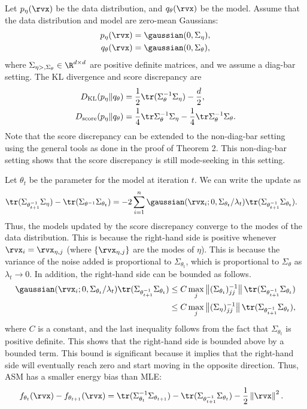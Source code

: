 \documentclass{article} %
\begin{document}
Let $p_{\eta}(\rvx)$ be the data distribution, and $q_{\theta}(\rvx)$ be the model. Assume that the data distribution and model are zero-mean Gaussians:
\begin{align*}
	p_{\eta}(\rvx) &= \gaussian(0, \Sigma_{\eta}), \\
    q_{\theta}(\rvx) &= \gaussian(0, \Sigma_{\theta}),
\end{align*}
where $\Sigma_{\eta>, \Sigma_{\theta}} \in \R^{d \times d}$ are positive definite matrices, and we assume a diag-bar setting. The KL divergence and score discrepancy are 
\begin{align*}
	D_{\text{KL}}(p_{\eta} \| q_{\theta}) &= \frac{1}{2} \tr(\Sigma_{\theta}^{-1} \Sigma_{\eta}) - \frac{d}{2}, \\
    D_{\text{score}}(p_{\eta} \| q_{\theta}) &= \frac{1}{4} \tr \Sigma_{\theta}^{-1} \Sigma_{\eta} - \frac{1}{4} \tr \Sigma_{\theta}^{-1} \Sigma_{\theta}.
\end{align*}
Note that the score discrepancy can be extended to the non-diag-bar setting using the general tools as done in the proof of Theorem 2. This non-diag-bar setting shows that the score discrepancy is still mode-seeking in this setting.

Let $\theta_{t}$ be the parameter for the model at iteration $t$. We can write the update as 
\begin{align*}
    \tr(\Sigma_{\theta_{t+1}^{-1}} \Sigma_{\eta}) - \tr(\Sigma_{\theta^{-1}} \Sigma_{\theta_{t}}) &= -2 \sum_{i=1}^{n} \gaussian(\rvx_{i} ; 0, \Sigma_{\theta_{t}} / \lambda_{t}) \tr(\Sigma_{\theta_{t+1}^{-1}} \Sigma_{\theta_{t}}).
\end{align*}
Thus, the models updated by the score discrepancy converge to the modes of the data distribution. This is because the right-hand side is positive whenever $\rvx_{i} = \rvx_{\eta, j}$ (where $\{\rvx_{\eta, j}\}$ are the modes of $\eta$). This is because the variance of the noise added is proportional to $\Sigma_{\theta_{t}}$, which is proportional to $\Sigma_{\theta}$ as $\lambda_{t} \to 0$. In addition, the right-hand side can be bounded as follows.
\begin{align*}
	\gaussian(\rvx_{i} ; 0, \Sigma_{\theta_{t}} / \lambda_{t}) \tr(\Sigma_{\theta_{t+1}^{-1}} \Sigma_{\theta_{t}}) &\leq C \max_{j} \left\| (\Sigma_{\theta_{t}})^{-1}_{jj} \right\| \tr(\Sigma_{\theta_{t+1}^{-1}} \Sigma_{\theta_{t}}) \\
	& \leq C \max_{j} \left\| (\Sigma_{\eta})^{-1}_{jj}\right\|  \tr(\Sigma_{\theta_{t+1}^{-1}} \Sigma_{\theta_{t}}),
\end{align*}
where $C$ is a constant, and the last inequality follows from the fact that $\Sigma_{\theta_{t}}$ is positive definite. This shows that the right-hand side is bounded above by a bounded term. This bound is significant because it implies that the right-hand side will eventually reach zero and start moving in the opposite direction. Thus, ASM has a smaller energy bias than MLE:
\begin{align*}
    f_{\theta_{t}}(\rvx) - f_{\theta_{t+1}}(\rvx) &= \tr(\Sigma_{\theta_{t}}^{-1} \Sigma_{\theta_{t+1}}) - \tr(\Sigma_{\theta_{t+1}^{-1}} \Sigma_{\theta_{t}}) - \frac{1}{2} \left\| \rvx  \right\|^{2}.
\end{align*}
\end{document}
